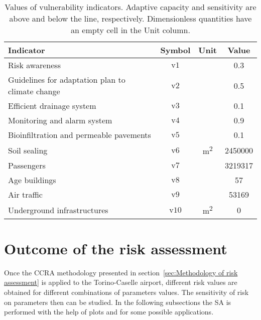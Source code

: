 \begin{table}[h]
  \renewcommand*{\arraystretch}{1.5}
  \centering
  \caption{Values of vulnerability indicators. Adaptive capacity and sensitivity are above and below the line, respectively. Dimensionless quantities have an empty cell in the Unit column.}
  \label{tab:values_vulnerability}
  \begin{tabular}{p{}ccc}
    Indicator                                        & Symbol         & Unit                 & Value   \\
    \hline
    Risk awareness                                   & $\mathrm{v1}$  &                      & 0.3     \\
    Guidelines for adaptation plan to climate change & $\mathrm{v2}$  &                      & 0.5     \\
    Efficient drainage system                        & $\mathrm{v3}$  &                      & 0.1     \\
    Monitoring and alarm system                      & $\mathrm{v4}$  &                      & 0.9     \\
    Bioinfiltration and permeable pavements          & $\mathrm{v5}$  &                      & 0.1     \\
    \hline
    Soil sealing                                     & $\mathrm{v6}$  & \unit{\square\metre} & 2450000 \\
    Passengers                                       & $\mathrm{v7}$  &                      & 3219317 \\
    Age buildings                                    & $\mathrm{v8}$  &                      & 57      \\
    Air traffic                                      & $\mathrm{v9}$  &                      & 53169   \\
    Underground infrastructures                      & $\mathrm{v10}$ & \unit{\square\metre} & 0       \\
    \end{tabular}
\end{table}



\section{Outcome of the risk assessment}
Once the \gls{CCRA} methodology presented in section~\ref{sec:Methodology of risk assessment} is applied to the Torino-Caselle airport, different \gls{risk} values are obtained for different combinations of parameters values.
The sensitivity of risk on parameters then can be studied. In the following subsections the \gls{SA} is performed with the help of plots and for some possible applications.



